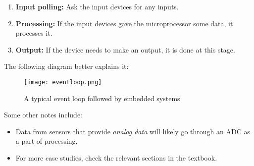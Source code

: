 \documentclass[../main.tex]{subfiles}
\begin{document}
\begin{enumerate}
    \item \textbf{Input polling:} Ask the input devices for any inputs.
    \item \textbf{Processing:} If the input devices gave the microprocessor some data, it processes it.
    \item \textbf{Output:} If the device needs to make an output, it is done at this stage.
\end{enumerate}

The following diagram better explains it:

\begin{figure}[H]
    \centering
    \texttt{[image: eventloop.png]}
    \caption{A typical event loop followed by embedded systems}
    \label{fig:eventloop}
\end{figure}

Some other notes include:

\begin{itemize}
    \item Data from sensors that provide \emph{analog data} will likely go through an ADC as a part of processing.
    \item For more case studies, check the relevant sections in the textbook.
\end{itemize}
\end{document}
